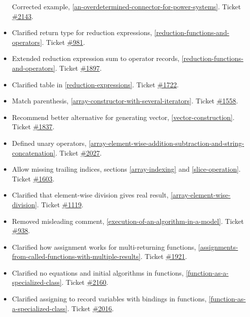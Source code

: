 \begin{itemize}
  Corrected example, \ref{an-overdetermined-connector-for-power-systems}. Ticket
  \href{https://trac.modelica.org/Modelica/ticket/2143}{\#2143}.
\item
  Clarified return type for reduction expressions, \ref{reduction-functions-and-operators}.
  Ticket \href{https://trac.modelica.org/Modelica/ticket/981}{\#981}.
\item
  Extended reduction expression sum to operator records, \ref{reduction-functions-and-operators}.
  Ticket \href{https://trac.modelica.org/Modelica/ticket/1897}{\#1897}.
\item
  Clarified table in \ref{reduction-expressions}. Ticket
  \href{https://trac.modelica.org/Modelica/ticket/1722}{\#1722}.
\item
  Match parenthesis, \ref{array-constructor-with-several-iterators}. Ticket
  \href{https://trac.modelica.org/Modelica/ticket/1558}{\#1558}.
\item
  Recommend better alternative for generating vector, \ref{vector-construction}.
  Ticket \href{https://trac.modelica.org/Modelica/ticket/1837}{\#1837}.
\item
  Defined unary operators, \ref{array-element-wise-addition-subtraction-and-string-concatenation}. Ticket
  \href{https://trac.modelica.org/Modelica/ticket/2027}{\#2027}.
\item
  Allow missing trailing indices, sections \ref{array-indexing} and \ref{slice-operation}. Ticket
  \href{https://trac.modelica.org/Modelica/ticket/1603}{\#1603}.
\item
  Clarified that element-wise division gives real result, 
  \ref{array-element-wise-division}. Ticket
  \href{https://trac.modelica.org/Modelica/ticket/1119}{\#1119}.
\item
  Removed misleading comment, \ref{execution-of-an-algorithm-in-a-model}. Ticket
  \href{https://trac.modelica.org/Modelica/ticket/938}{\#938}.
\item
  Clarified how assignment works for multi-returning functions, 
  \ref{assignments-from-called-functions-with-multiple-results}. Ticket
  \href{https://trac.modelica.org/Modelica/ticket/1921}{\#1921}.
\item
  Clarified no equations and initial algorithms in functions, 
  \ref{function-as-a-specialized-class}. Ticket
  \href{https://trac.modelica.org/Modelica/ticket/2160}{\#2160}.
\item
  Clarified assigning to record variables with bindings in functions,
  \ref{function-as-a-specialized-class}. Ticket
  \href{https://trac.modelica.org/Modelica/ticket/2016}{\#2016}.

\end{itemize}
